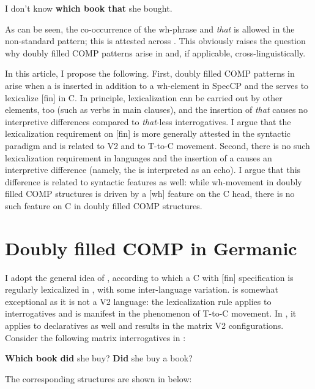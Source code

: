 \documentclass[output=paper,modfonts, hidelinks, newtxmath]{langscibook}
\begin{document}
\ea
	  I don't know \textbf{which book that} she bought. \label{whichbookthat} 
\z
\largerpage

\noindent As can be seen, the co-occurrence of the wh-phrase and \textit{that} is allowed in the non-standard pattern; this is attested across . This obviously raises the question why doubly filled COMP patterns arise in  and, if applicable, cross-linguistically.

In this article, I propose the following. First, doubly filled COMP patterns in  arise when a  is inserted in addition to a wh-element in SpecCP and the  serves to lexicalize [fin] in C. In principle, lexicalization can be carried out by other elements, too (such as verbs in main clauses), and the insertion of \textit{that} causes no interpretive differences compared to \textit{that}-less interrogatives. I argue that the lexicalization requirement on [fin] is more generally attested in the syntactic paradigm and is related to V2 and to T-to-C movement. Second, there is no such lexicalization requirement in  languages and the insertion of a  causes an interpretive difference (namely, the  is interpreted as an echo). I argue that this difference is related to syntactic features as well: while wh-movement in  doubly filled COMP structures is driven by a [wh] feature on the C head, there is no such feature on C in  doubly filled COMP structures.

\section{Doubly filled COMP in Germanic}
\largerpage %
I adopt the general idea of \citet{bacskaiatkaritoappear}, according to which a C with  [fin] specification is regularly lexicalized in , with some inter-language variation.  is somewhat exceptional as it is not a V2 language: the lexicalization rule applies to interrogatives and is manifest in the phenomenon of T-to-C movement. In , it applies to declaratives as well and results in the matrix V2 configurations. Consider the following matrix interrogatives in :

\ea
	\ea \textbf{Which book did} she buy? 
	\ex \textbf{Did} she buy a book? 
	\z
\z

\noindent The corresponding structures are shown in  below:
\end{document}

